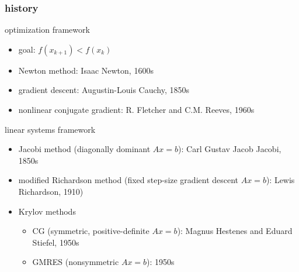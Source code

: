 \documentclass[10pt,dvipsnames*]{beamer}
\begin{document}
\begin{frame}
  \frametitle{history}
  \pause
  \begin{block}{optimization framework}
    \begin{itemize}
      \item \alert{goal}: $f(x_{k+1}) < f(x_k)$
      \item Newton method: Isaac Newton, 1600s
      \item gradient descent: Augustin-Louis Cauchy, 1850s
      \item nonlinear conjugate gradient: R. Fletcher and C.M. Reeves, \alert<5>{1960s}
    \end{itemize}
  \end{block}
  \pause
  \begin{block}{linear systems framework}
    \begin{itemize}
      \item Jacobi method (diagonally dominant $Ax=b$): Carl Gustav Jacob Jacobi, 1850s
      \item modified Richardson method (fixed step-size gradient descent $Ax=b$): Lewis Richardson, 1910)
      \item Krylov methods
      \begin{itemize}
        \item CG (symmetric, positive-definite $Ax=b$): Magnus Hestenes and Eduard Stiefel, 1950s
        \item GMRES (nonsymmetric $Ax=b$): \alert<5>{1950s}
      \end{itemize}
    \end{itemize}
  \end{block}
  \pause
\end{frame}
%
\end{document}
